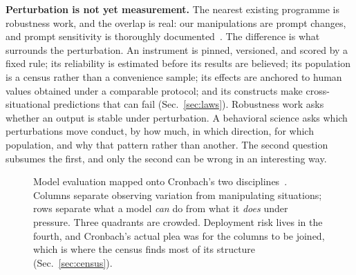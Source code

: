 \documentclass[journal]{IEEEtran}
\begin{document}
\textbf{Perturbation is not yet measurement.} The nearest existing
programme is robustness work, and the overlap is real: our
manipulations are prompt changes, and prompt sensitivity is
thoroughly documented~\cite{sclar2024quantifying}. The difference is
what surrounds the perturbation. An instrument is pinned, versioned,
and scored by a fixed rule; its reliability is estimated before its
results are believed; its population is a census rather than a
convenience sample; its effects are anchored to human values obtained
under a comparable protocol; and its constructs make
cross-situational predictions that can fail
(Sec.~\ref{sec:laws}). Robustness work asks whether an output is
stable under perturbation. A behavioral science asks which
perturbations move conduct, by how much, in which direction, for
which population, and why that pattern rather than another. The
second question subsumes the first, and only the second can be wrong
in an interesting way.

\begin{figure}[t]
\centering
{}
\caption{Model evaluation mapped onto Cronbach's two
disciplines~\cite{cronbach1957two}. Columns separate observing
variation from manipulating situations; rows separate what a model
\emph{can} do from what it \emph{does} under pressure. Three
quadrants are crowded. Deployment risk lives in the fourth, and
Cronbach's actual plea was for the columns to be joined, which is
where the census finds most of its structure
(Sec.~\ref{sec:census}).}
\label{fig:quadrants}
\end{figure}
\end{document}
